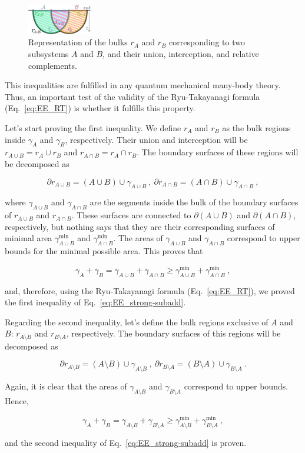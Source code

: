 \documentclass[twocolumn]{revtex4}
\providecommand{\eq}[2]{
    \begin{equation}
        #2
    \label{eq:#1}
    \end{equation}
}
\begin{document}
\begin{figure}
    \centering
    \includegraphics[width=0.25\textwidth]{../imatges/SS_D.png}
\caption{Representation of the bulks $r_A$ and $r_B$ corresponding to two subsystems $A$ and $B$, and their union, interception, and relative complements.}
\label{fig:SS}
\end{figure}

This inequalities are fulfilled in any quantum mechanical many-body theory. Thus, an important test of the validity of the Ryu-Takayanagi formula (Eq.~\ref{eq:EE_RT}) is whether it fulfills this property.

Let's start proving the first inequality. We define $r_A$ and $r_B$ as the bulk regions inside $\gamma_A$ and $\gamma_B$, respectively. Their union and interception will be $r_{A \cup B} = r_A \cup r_B$ and $r_{A \cap B} = r_A \cap r_B$. The boundary surfaces of these regions will be decomposed as
\eq{SS_dr-1}{
    \partial r_{A \cup B} = (A \cup B) \cup \gamma_{A \cup B} \ , \ \partial r_{A \cap B } = (A \cap B) \cup \gamma_{A \cap B} \ , \nonumber
}
where $\gamma_{A \cup B}$ and $\gamma_{A \cap B}$ are the segments inside the bulk of the boundary surfaces of $r_{A \cup B}$ and $r_{A \cap B}$. These surfaces are connected to $\partial (A \cup B)$ and $\partial (A \cap B)$, respectively, but nothing says that they are their corresponding surfaces of minimal area $\gamma^{\text{min}}_{A \cup B}$ and $\gamma^{\text{min}}_{A \cap B}$. The areas of $\gamma_{A \cup B}$ and $\gamma_{A \cap B}$ correspond to upper bounds for the minimal possible area. This proves that
\eq{SS_gamma-1}{
    \gamma_A + \gamma_B = \gamma_{A \cup B} + \gamma_{A \cap B} \ge \gamma^{\text{min}}_{A \cup B} + \gamma^{\text{min}}_{A \cap B} \ , \nonumber
}
and, therefore, using the Ryu-Takayanagi formula (Eq.~\ref{eq:EE_RT}), we proved the first inequality of Eq.~\ref{eq:EE_strong-subadd}.

Regarding the second inequality, let's define the bulk regions exclusive of $A$ and $B$: $r_{A \setminus B}$ and $r_{B \setminus A}$, respectively. The boundary surfaces of this regions will be decomposed as
\eq{SS_dr-2}{
    \partial r_{A \setminus B} = (A \setminus B) \cup \gamma_{A \setminus B} \ , \ \partial r_{B \setminus A } = (B \setminus A) \cup \gamma_{B \setminus A} \ . \nonumber
}
Again, it is clear that the areas of $\gamma_{A \setminus B}$ and $\gamma_{B \setminus A}$ correspond to upper bounds. Hence,
\eq{SS_gamma-2}{
    \gamma_A + \gamma_B = \gamma_{A \setminus B} + \gamma_{B \setminus A} \ge \gamma^{\text{min}}_{A \setminus B} + \gamma^{\text{min}}_{B \setminus A} \ , \nonumber
}
and the second inequality of Eq.~\ref{eq:EE_strong-subadd} is proven.
\end{document}
